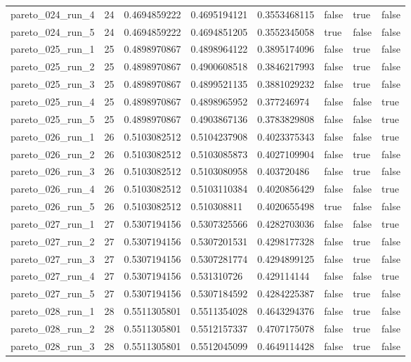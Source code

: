 \begin{tabular}{@{}llllllll@{}}
pareto\_024\_run\_4 & 24 & 0.4694859222 & 0.4695194121 & 0.3553468115 & false & true & false \\
pareto\_024\_run\_5 & 24 & 0.4694859222 & 0.4694851205 & 0.3552345058 & true & false & false \\
pareto\_025\_run\_1 & 25 & 0.4898970867 & 0.4898964122 & 0.3895174096 & false & true & false \\
pareto\_025\_run\_2 & 25 & 0.4898970867 & 0.4900608518 & 0.3846217993 & false & true & false \\
pareto\_025\_run\_3 & 25 & 0.4898970867 & 0.4899521135 & 0.3881029232 & false & true & false \\
pareto\_025\_run\_4 & 25 & 0.4898970867 & 0.4898965952 & 0.377246974 & false & false & true \\
pareto\_025\_run\_5 & 25 & 0.4898970867 & 0.4903867136 & 0.3783829808 & false & false & true \\
pareto\_026\_run\_1 & 26 & 0.5103082512 & 0.5104237908 & 0.4023375343 & false & false & true \\
pareto\_026\_run\_2 & 26 & 0.5103082512 & 0.5103085873 & 0.4027109904 & false & true & false \\
pareto\_026\_run\_3 & 26 & 0.5103082512 & 0.5103080958 & 0.403720486 & false & true & false \\
pareto\_026\_run\_4 & 26 & 0.5103082512 & 0.5103110384 & 0.4020856429 & false & false & true \\
pareto\_026\_run\_5 & 26 & 0.5103082512 & 0.510308811 & 0.4020655498 & true & false & false \\
pareto\_027\_run\_1 & 27 & 0.5307194156 & 0.5307325566 & 0.4282703036 & false & false & true \\
pareto\_027\_run\_2 & 27 & 0.5307194156 & 0.5307201531 & 0.4298177328 & false & true & false \\
pareto\_027\_run\_3 & 27 & 0.5307194156 & 0.5307281774 & 0.4294899125 & false & true & false \\
pareto\_027\_run\_4 & 27 & 0.5307194156 & 0.531310726 & 0.429114144 & false & false & true \\
pareto\_027\_run\_5 & 27 & 0.5307194156 & 0.5307184592 & 0.4284225387 & false & true & false \\
pareto\_028\_run\_1 & 28 & 0.5511305801 & 0.5511354028 & 0.4643294376 & false & true & false \\
pareto\_028\_run\_2 & 28 & 0.5511305801 & 0.5512157337 & 0.4707175078 & false & true & false \\
pareto\_028\_run\_3 & 28 & 0.5511305801 & 0.5512045099 & 0.4649114428 & false & true & false \\

\end{tabular}
